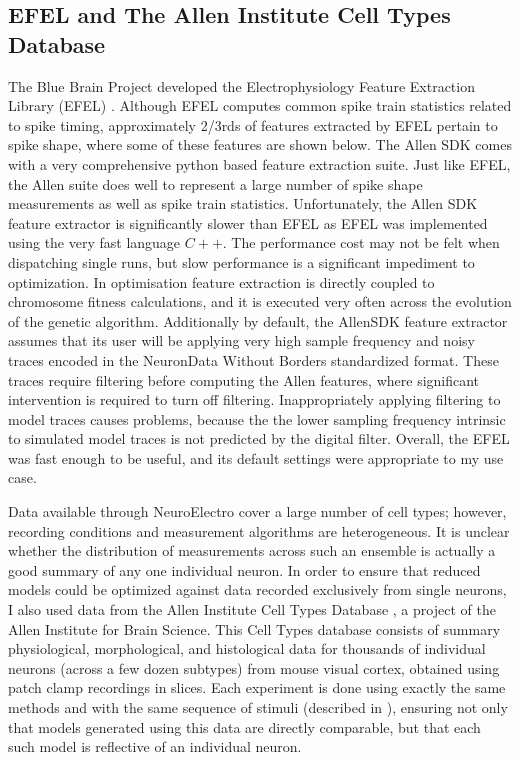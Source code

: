 \subsection{EFEL and The Allen Institute Cell Types Database}
The Blue Brain Project developed the Electrophysiology Feature Extraction Library (EFEL) \citep{EFEL}. Although EFEL computes common spike train statistics related to spike timing, approximately 2/3rds of features extracted by EFEL pertain to spike shape, where some of these features are shown below. The Allen SDK comes with a very comprehensive python based feature extraction suite. Just like EFEL, the Allen suite does well to represent a large number of spike shape measurements as well as spike train statistics. Unfortunately, the Allen SDK feature extractor is significantly slower than EFEL as EFEL was implemented using the very fast language $C++$. The performance cost may not be felt when dispatching single runs, but slow performance is a significant impediment to optimization. In optimisation feature extraction is directly coupled to chromosome fitness calculations, and it is executed very often across the evolution of the genetic algorithm. Additionally by default, the AllenSDK feature extractor assumes that its user will be applying very high sample frequency and noisy traces encoded in the NeuronData Without Borders \citep{teeters2015neurodata} standardized format. These traces require filtering before computing the Allen features, where significant intervention is required to turn off filtering. Inappropriately applying filtering to model traces causes problems, because the the lower sampling frequency intrinsic to simulated model traces is not predicted by the digital filter. Overall, the EFEL was fast enough to be useful, and its default settings were appropriate to my use case. 
\cite{garcia2014neo}

Data available through NeuroElectro cover a large number of cell types; however, recording conditions and measurement algorithms are heterogeneous.
It is unclear whether the distribution of measurements across such an ensemble is actually a good summary of any one individual neuron.
In order to ensure that reduced models could be optimized against data recorded exclusively from single neurons, I also used data from the Allen Institute Cell Types Database \citep{celltypes}, a project of the Allen Institute for Brain Science.
This Cell Types database consists of summary physiological, morphological, and histological data for thousands of individual neurons (across a few dozen subtypes) from mouse visual cortex, obtained using patch clamp recordings in slices.
Each experiment is done using exactly the same methods and with the same sequence of stimuli (described in \cite{celltypes}), ensuring not only that models generated using this data are directly comparable, but that each such model is reflective of an individual neuron.


